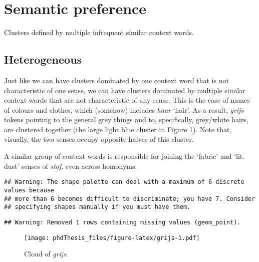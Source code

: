 \documentclass[
]{book}
\begin{document}
\hypertarget{semantic-preference}{%
\section{Semantic preference}\label{semantic-preference}}

Clusters defined by multiple infrequent similar context words.

\hypertarget{heterogeneous-1}{%
\subsection{Heterogeneous}\label{heterogeneous-1}}

Just like we can have clusters dominated by one context word that is not characteristic of one sense, we can have clusters dominated by multiple similar context words that are not characteristic of any sense. This is the case of names of colours and clothes, which (somehow) includes \emph{haar} `hair'. As a result, \emph{grijs} tokens pointing to the general grey things and to, specifically, grey/white hairs, are clustered together (the large light blue cluster in Figure \ref{fig:grijs}). Note that, visually, the two senses occupy opposite halves of this cluster.

A similar group of context words is responsible for joining the `fabric' and `lit. dust' senses of \emph{stof}, even across homonyms.



\begin{verbatim}
## Warning: The shape palette can deal with a maximum of 6 discrete values because
## more than 6 becomes difficult to discriminate; you have 7. Consider
## specifying shapes manually if you must have them.
\end{verbatim}

\begin{verbatim}
## Warning: Removed 1 rows containing missing values (geom_point).
\end{verbatim}

\begin{figure}
\centering
\texttt{[image: phdThesis\_files/figure-latex/grijs-1.pdf]}
\caption{\label{fig:grijs}Cloud of \emph{grijs}.}
\end{figure}
\end{document}

